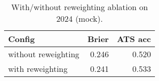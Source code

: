 \begin{table}[t]
  \centering
  \small
  \caption{With/without reweighting ablation on 2024 (mock).}
  \begin{tabular}{lrr}
    \toprule
    Config & Brier & ATS acc \\
    \midrule
    without reweighting & 0.246 & 0.520 \\
    with reweighting    & 0.241 & 0.533 \\
    \bottomrule
  \end{tabular}
\end{table}
